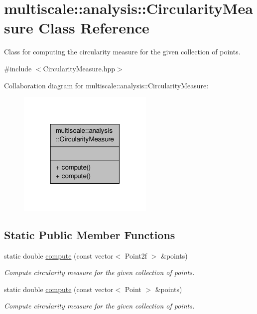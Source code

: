 \hypertarget{classmultiscale_1_1analysis_1_1CircularityMeasure}{\section{multiscale\-:\-:analysis\-:\-:Circularity\-Measure Class Reference}
\label{classmultiscale_1_1analysis_1_1CircularityMeasure}
}


Class for computing the circularity measure for the given collection of points.  




{\ttfamily \#include $<$Circularity\-Measure.\-hpp$>$}



Collaboration diagram for multiscale\-:\-:analysis\-:\-:Circularity\-Measure\-:
\nopagebreak
\begin{figure}[H]
\begin{center}
\leavevmode
\includegraphics[width=184pt]{classmultiscale_1_1analysis_1_1CircularityMeasure__coll__graph}
\end{center}
\end{figure}
\subsection*{Static Public Member Functions}
\begin{DoxyCompactItemize}
\item 
static double \hyperlink{classmultiscale_1_1analysis_1_1CircularityMeasure_a819f1b1f9d7cdd96de2a6d9c5b6c6caa}{compute} (const vector$<$ Point2f $>$ \&points)
\begin{DoxyCompactList}\small\item\em Compute circularity measure for the given collection of points. \end{DoxyCompactList}\item 
static double \hyperlink{classmultiscale_1_1analysis_1_1CircularityMeasure_a252830f574cd4a85f108f74265520a8f}{compute} (const vector$<$ Point $>$ \&points)
\begin{DoxyCompactList}\small\item\em Compute circularity measure for the given collection of points. \end{DoxyCompactList}\end{DoxyCompactItemize}



